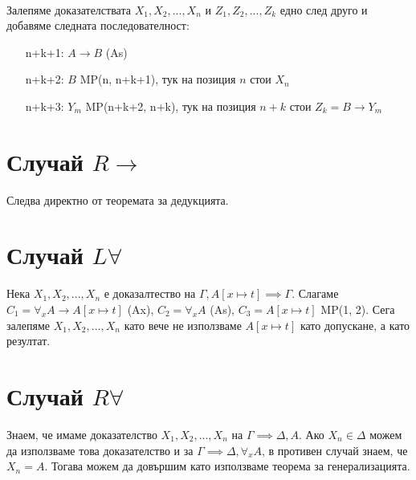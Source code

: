 \documentclass[12pt]{article}
\begin{document}
\paragraph*{}
Залепяме доказателствата $X_1, X_2, ..., X_n$ и $Z_1, Z_2, ..., Z_k$ едно след друго и добавяме следната последователност:
\begin{itemize}[itemindent=4em]
    \item[n+k+1: ] $A \rightarrow B$ (As)
    \item[n+k+2: ] $B$ MP(n, n+k+1), тук на позиция $n$ стои $X_n$  
    \item[n+k+3: ] $Y_m$ MP(n+k+2, n+k), тук на позиция $n+k$ стои $Z_k = B \rightarrow Y_m$  
\end{itemize}

\section*{Случай $R \rightarrow$}
Следва директно от теоремата за дедукцията.

\section*{Случай $L \forall$}
Нека $X_1, X_2, ..., X_n$ е доказалтество на $\Gamma, A[x \longmapsto t] \implies \Gamma$. Слагаме $C_1 = \forall_x A \rightarrow A[x \longmapsto t]$ (Ax), $C_2 = \forall_x A$ (As), $C_3 = A[x \longmapsto t]$ MP(1, 2). Сега залепяме $X_1, X_2, ..., X_n$ като вече не използваме $A[x \longmapsto t]$ като допускане, а като резултат.

\section*{Случай $R \forall$}
Знаем, че имаме доказателство $X_1, X_2, ..., X_n$ на $\Gamma \implies \Delta, A$. Ако $X_n \in \Delta$ можем да използваме това доказателство и за $\Gamma \implies \Delta, \forall_x A$, в противен случай знаем, че $X_n = A$. Тогава можем да довършим като използваме теорема за генерализацията.
\end{document}
